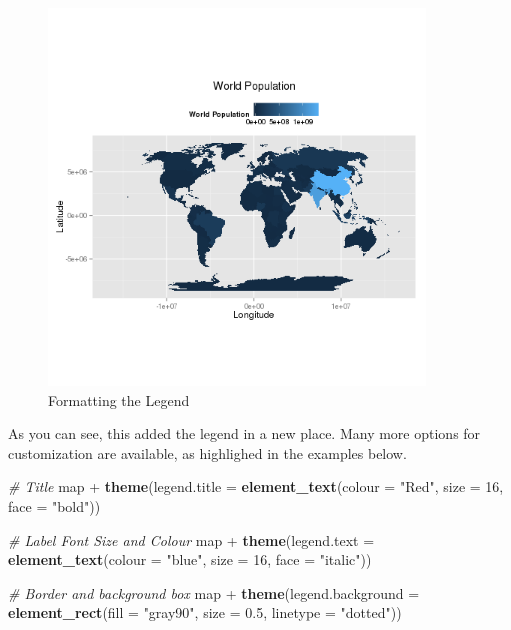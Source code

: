 \documentclass[]{article}
\newenvironment{Shaded}{}{}
\newcommand{\KeywordTok}[1]{\textcolor[rgb]{0.00,0.44,0.13}{\textbf{{#1}}}}
\newcommand{\DataTypeTok}[1]{\textcolor[rgb]{0.56,0.13,0.00}{{#1}}}
\newcommand{\DecValTok}[1]{\textcolor[rgb]{0.25,0.63,0.44}{{#1}}}
\newcommand{\FloatTok}[1]{\textcolor[rgb]{0.25,0.63,0.44}{{#1}}}
\newcommand{\StringTok}[1]{\textcolor[rgb]{0.25,0.44,0.63}{{#1}}}
\newcommand{\CommentTok}[1]{\textcolor[rgb]{0.38,0.63,0.69}{\textit{{#1}}}}
\newcommand{\NormalTok}[1]{{#1}}
\let\Oldincludegraphics\includegraphics
\renewcommand{\includegraphics}[1]{\Oldincludegraphics[width=10cm]{#1}}
\begin{document}
\begin{figure}[htbp]
\centering
\includegraphics{figure/Formatting_the_Legend.png}
\caption{Formatting the Legend}
\end{figure}

As you can see, this added the legend in a new place. Many more options
for customization are available, as highlighed in the examples below.

\begin{Shaded}
\begin{Highlighting}[]
\CommentTok{# Title}
\NormalTok{map + }\KeywordTok{theme}\NormalTok{(}\DataTypeTok{legend.title =} \KeywordTok{element_text}\NormalTok{(}\DataTypeTok{colour =} \StringTok{"Red"}\NormalTok{, }\DataTypeTok{size =} \DecValTok{16}\NormalTok{, }\DataTypeTok{face =} \StringTok{"bold"}\NormalTok{))}

\CommentTok{# Label Font Size and Colour}
\NormalTok{map + }\KeywordTok{theme}\NormalTok{(}\DataTypeTok{legend.text =} \KeywordTok{element_text}\NormalTok{(}\DataTypeTok{colour =} \StringTok{"blue"}\NormalTok{, }\DataTypeTok{size =} \DecValTok{16}\NormalTok{, }\DataTypeTok{face =} \StringTok{"italic"}\NormalTok{))}

\CommentTok{# Border and background box}
\NormalTok{map + }\KeywordTok{theme}\NormalTok{(}\DataTypeTok{legend.background =} \KeywordTok{element_rect}\NormalTok{(}\DataTypeTok{fill =} \StringTok{"gray90"}\NormalTok{, }\DataTypeTok{size =} \FloatTok{0.5}\NormalTok{, }\DataTypeTok{linetype =} \StringTok{"dotted"}\NormalTok{))}
\end{Highlighting}
\end{Shaded}
\end{document}
